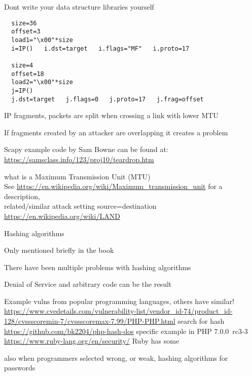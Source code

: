 \documentclass[Screen16to9,17pt]{foils}
\begin{document}
\vskip 1cm
\centerline{Dont write your data structure libraries yourself}


\begin{verbatim}
  size=36
  offset=3
  load1="\x00"*size
  i=IP()   i.dst=target   i.flags="MF"   i.proto=17

  size=4
  offset=18
  load2="\x00"*size
  j=IP()
  j.dst=target   j.flags=0   j.proto=17   j.frag=offset
\end{verbatim}

\begin{list2}
\item IP fragments, packets are split when crossing a link with lower MTU
\item If fragments created by an attacker are overlapping it creates a problem
\item Scapy example code by Sam Bowne can be found at:\\
\url{https://samsclass.info/123/proj10/teardrop.htm}
\item what is a Maximum Transmission Unit (MTU)\\
See \url{https://en.wikipedia.org/wiki/Maximum_transmission_unit} for a description,\\ related/similar attack setting source=destination \url{https://en.wikipedia.org/wiki/LAND}
\end{list2}




\begin{list2}
\item Hashing algorithms
\item Only mentioned briefly in the book
\item There have been multiple problems with hashing algorithms
\item Denial of Service and arbitrary code can be the result
\item Example vulns from popular programming languages, others have similar!\\
\url{https://www.cvedetails.com/vulnerability-list/vendor_id-74/product_id-128/cvssscoremin-7/cvssscoremax-7.99/PHP-PHP.html} search for hash \\
\url{https://github.com/bk2204/php-hash-dos} specific example in PHP 7.0.0~rc3-3\\
\url{https://www.ruby-lang.org/en/security/} Ruby has some
\item also when programmers selected wrong, or weak, hashing algorithms for passwords
\end{list2}
\end{document}

